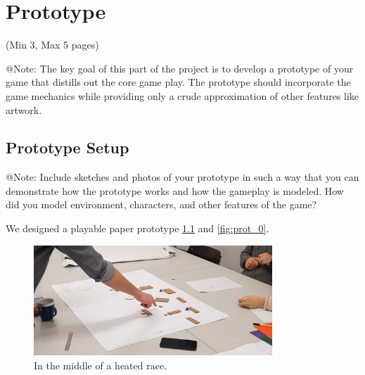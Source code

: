 \chapter{Prototype}

\begin{TempText}
	(Min 3, Max 5 pages)
\end{TempText}

\begin{TempText}
	@Note: The key goal of this part of the project is to develop a prototype of your game that distills out the core game play. The prototype should incorporate the game mechanics while providing only a crude approximation of other features like artwork.
\end{TempText}


\section{Prototype Setup}

\begin{TempText}
	@Note: Include sketches and photos of your prototype in such a way that you can demonstrate how the prototype works and how the gameplay is modeled. How did you model environment, characters, and other features of the game?
\end{TempText}

We designed a playable paper prototype \ref{fig:prot_stalll} and \ref{fig:prot_0}.

\begin{figure}
    \centering
    \includegraphics[width=0.8\textwidth]{figures/Prototype/staaall.jpg}
    \caption{In the middle of a heated race.}
    \label{fig:prot_stalll}
\end{figure}


